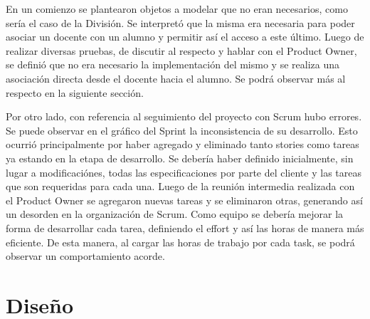\documentclass[a4paper, 11pt]{article}
\begin{document}
En un comienzo se plantearon objetos a modelar que no eran necesarios, como sería el caso de la División. Se interpretó que la misma era necesaria para poder asociar un docente con un alumno y permitir así el acceso a este último. Luego de realizar diversas pruebas, de discutir al respecto y hablar con el Product Owner, se definió que no era necesario la implementación del mismo y se realiza una asociación directa desde el docente hacia el alumno. Se podrá observar más al respecto en la siguiente sección. 

Por otro lado, con referencia al seguimiento del proyecto con Scrum hubo errores. Se puede observar en el gráfico del Sprint la inconsistencia de su desarrollo. Esto ocurrió principalmente por haber agregado y eliminado tanto stories como tareas ya estando en la etapa de desarrollo. Se debería haber definido inicialmente, sin lugar a modificaciónes, todas las especificaciones por parte del cliente y las tareas que son requeridas para cada una. Luego de la reunión intermedia realizada con el Product Owner se agregaron nuevas tareas y se eliminaron otras, generando así un desorden en la organización de Scrum. Como equipo se debería mejorar la forma de desarrollar cada tarea, definiendo el effort y así las horas de manera más eficiente. De esta manera, al cargar las horas de trabajo por cada task, se podrá observar un comportamiento acorde. 


\newpage

\section{Diseño}

\end{document}
